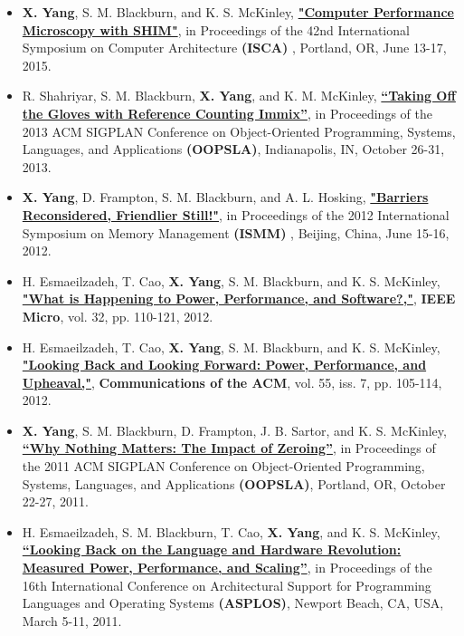 \documentclass[letterpaper,11pt]{article}
\begin{document}
\begin{itemize}

\item {\bf X. Yang}, S. M. Blackburn, and K. S. McKinley, \href{https://github.com/yangxi/papers/raw/master/shim-isca-2015.pdf} {\color{blue} \bf
    "Computer Performance Microscopy with SHIM"}, in Proceedings of the 42nd International 
     Symposium on Computer Architecture {\bf (ISCA) }, Portland,
     OR, June 13-17, 2015.

\item R. Shahriyar, S. M. Blackburn, {\bf X. Yang}, and K. M. McKinley,
  \href{https://github.com/yangxi/papers/raw/master/rcix-oopsla-2013.pdf}{\color{blue} \bf
      ``Taking Off the Gloves with Reference Counting Immix''}, in Proceedings of 
      the 2013 ACM SIGPLAN Conference on Object-Oriented Programming, Systems,
      Languages, and Applications {\bf (OOPSLA)}, Indianapolis, IN,
      October 26-31, 2013.

\item{\bf X. Yang}, D. Frampton, S. M. Blackburn, and A. L. Hosking,
  \href{https://github.com/yangxi/papers/raw/master/barrier-ismm-2012.pdf}{\color{blue} \bf
    "Barriers Reconsidered, Friendlier Still!"}, in Proceedings of the 2012
  International Symposium on Memory Management {\bf (ISMM) }, Beijing,
  China, June 15-16, 2012.

\item H. Esmaeilzadeh, T. Cao, {\bf X. Yang}, S. M. Blackburn, and
    K. S. McKinley,
    \href{https://github.com/yangxi/papers/raw/master/powerperf-micro-2012.pdf}{\color{blue}
      \bf "What is Happening to Power, Performance, and
      Software?,"}, {\bf IEEE Micro}, vol. 32, pp. 110-121, 2012. 

\item H. Esmaeilzadeh, T. Cao, {\bf X. Yang}, S. M. Blackburn, and
    K. S. McKinley, \href{https://github.com/yangxi/papers/raw/master/powerperf-cacm-2012.pdf}{\color{blue}\bf "Looking Back and Looking Forward: Power, Performance,
      and Upheaval,"}, {\bf Communications of the ACM}, vol. 55, iss. 7, pp. 105-114, 2012.

\item {\bf X. Yang}, S. M. Blackburn, D. Frampton, J. B. Sartor, and
  K. S. McKinley,
  \href{https://github.com/yangxi/papers/raw/master/zero-oopsla-2011.pdf}
  {\color{blue} \bf ``Why Nothing Matters: The Impact of Zeroing''}, in Proceedings of 
the 2011 ACM SIGPLAN Conference on Object-Oriented Programming, Systems, Languages, and Applications {\bf (OOPSLA)}, Portland, OR, October 22-27, 2011.

\item H. Esmaeilzadeh, S. M. Blackburn, T. Cao, {\bf X. Yang}, and
  K. S. McKinley,
  \href{https://github.com/yangxi/papers/raw/master/powerperf-asplos-2011.pdf}
  {\color{blue} \bf ``Looking Back on the Language and Hardware Revolution:
    Measured Power, Performance, and Scaling''}, in Proceedings of the 16th
  International Conference on Architectural Support for Programming Languages
  and Operating Systems {\bf (ASPLOS)}, Newport Beach, CA, USA, March 5-11,
  2011.
\end{itemize}
\end{document}

